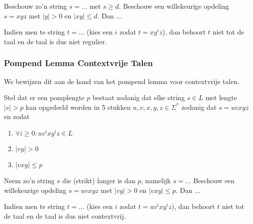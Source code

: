 \documentclass[kulak]{kulakarticle}
\newcommand{\abs}[1]{\lvert #1 \rvert}
\theoremstyle{definition}
\begin{document}
	Beschouw zo'n string \(s=...\) met \(s \geq d\). Beschouw een willekeurige opdeling \(s=xyz\) met \(\abs{y}>0\) en \(\abs{xy}\leq d\). Dan ...

	Indien men te string \(t=...\) (kies een \(i\) zodat \(t=xy^iz\)), dan behoort \(t\) niet tot de taal en de taal is dus niet regulier.

	\subsubsection*{Pompend Lemma Contextvrije Talen}

	We bewijzen dit aan de hand van het pompend lemma voor contextvrije talen.

	Stel dat er een pomplengte \(p\) bestaat zodanig dat elke string \(s \in L\) met lengte \(\abs{s}>p\) kan opgedeeld worden in 5 stukken \(u,v,x,y,z \in \Sigma^*\) zodanig dat \(s=uvxyz\) en zodat\begin{enumerate}
		\item \(\forall i \geq 0 : uv^ixy^iz \in L \)
		\item \(\abs{vy}>0\)
		\item \(\abs{vxy}\leq p\)
	\end{enumerate}

	Neem zo'n string \(s\) die (strikt) langer is dan \(p\), namelijk \(s=...\)
	Beschouw een willekeurige opdeling \(s=uvxyz\) met \(\abs{vy}>0\) en \(\abs{vxy}\leq p\). Dan ...

	Indien men te string \(t=...\) (kies een \(i\) zodat \(t=uv^ixy^iz\)), dan behoort \(t\) niet tot de taal en de taal is dus niet contextvrij.
\end{document}
